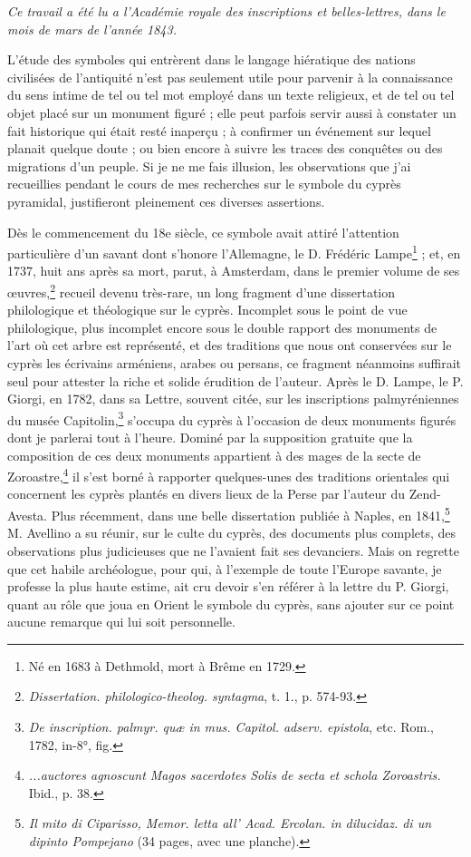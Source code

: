 \documentclass[a4paper, 11pt, oneside, polutonikogreek, french]{article}
\begin{document}
\emph{Ce travail a été lu a l'Académie royale des inscriptions et belles-lettres, dans le mois de mars de l'année 1843.}

L'étude des symboles qui entrèrent dans le langage hiératique des nations civilisées de l'antiquité n'est pas seulement utile pour parvenir à la connaissance du sens intime de tel ou tel mot employé dans un texte religieux, et de tel ou tel objet placé sur un monument figuré ; elle peut parfois servir aussi à constater un fait historique qui était resté inaperçu ; à confirmer un événement sur lequel planait quelque doute ; ou bien encore à suivre les traces des conquêtes ou des migrations d'un peuple. Si je ne me fais illusion, les observations que j'ai recueillies pendant le cours de mes recherches sur le symbole du cyprès pyramidal, justifieront pleinement ces diverses assertions.

Dès le commencement du 18e siècle, ce symbole avait attiré l'attention particulière d'un savant dont s'honore l'Allemagne, le D. Frédéric Lampe\footnote{Né en 1683 à Dethmold, mort à Brême en 1729.} ; et, en 1737, huit ans après sa mort, parut, à Amsterdam, dans le premier volume de ses œuvres,\footnote{\emph{Dissertation. philologico-theolog. syntagma}, t. 1., p. 574-93.} recueil devenu très-rare, un long fragment d'une dissertation philologique et théologique sur le cyprès. Incomplet sous le point de vue philologique, plus incomplet encore sous le double rapport des monuments de l'art où cet arbre est représenté, et des traditions que nous ont conservées sur le cyprès les écrivains arméniens, arabes ou persans, ce fragment néanmoins suffirait seul pour attester la riche et solide érudition de l'auteur. Après le D. Lampe, le P. Giorgi, en 1782, dans sa Lettre, souvent citée, sur les inscriptions palmyréniennes du musée Capitolin,\footnote{\emph{De inscription. palmyr. quæ in mus. Capitol. adserv. epistola}, etc. Rom., 1782, in-8°, fig.} s'occupa du cyprès à l'occasion de deux monuments figurés dont je parlerai tout à l'heure. Dominé par la supposition gratuite que la composition de ces deux monuments appartient à des mages de la secte de Zoroastre,\footnote{\emph{...auctores agnoscunt Magos sacerdotes Solis de secta et schola Zoroastris.} Ibid., p. 38.} il s'est borné à rapporter quelques-unes des traditions orientales qui concernent les cyprès plantés en divers lieux de la Perse par l'auteur du Zend-Avesta. Plus récemment, dans une belle dissertation publiée à Naples, en 1841,\footnote{\emph{Il mito di Ciparisso, Memor. letta all' Acad. Ercolan. in dilucidaz. di un dipinto Pompejano} (34 pages, avec une planche).} M. Avellino a su réunir, sur le culte du cyprès, des documents plus complets, des observations plus judicieuses que ne l'avaient fait ses devanciers. Mais on regrette que cet habile archéologue, pour qui, à l'exemple de toute l'Europe savante, je professe la plus haute estime, ait cru devoir s'en référer à la lettre du P. Giorgi, quant au rôle que joua en Orient le symbole du cyprès, sans ajouter sur ce point aucune remarque qui lui soit personnelle.
\end{document}
